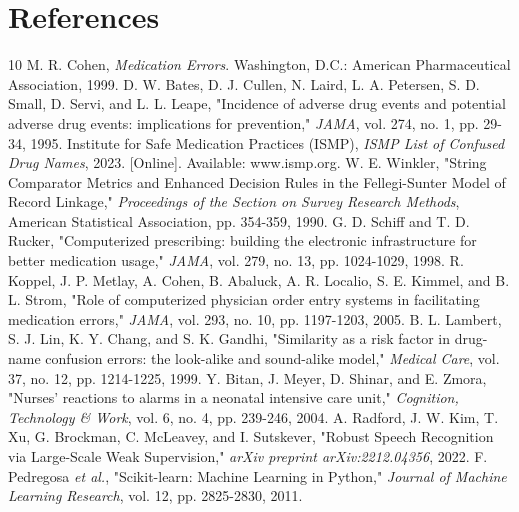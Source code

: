 \documentclass[12pt,a4paper]{report}
\begin{document}
\chapter*{References}
\begin{thebibliography}{10}
     M. R. Cohen, \textit{Medication Errors}. Washington, D.C.: American Pharmaceutical Association, 1999.
     D. W. Bates, D. J. Cullen, N. Laird, L. A. Petersen, S. D. Small, D. Servi, and L. L. Leape, "Incidence of adverse drug events and potential adverse drug events: implications for prevention," \textit{JAMA}, vol. 274, no. 1, pp. 29-34, 1995.
     Institute for Safe Medication Practices (ISMP), \textit{ISMP List of Confused Drug Names}, 2023. [Online]. Available: www.ismp.org.
     W. E. Winkler, "String Comparator Metrics and Enhanced Decision Rules in the Fellegi-Sunter Model of Record Linkage," \textit{Proceedings of the Section on Survey Research Methods}, American Statistical Association, pp. 354-359, 1990.
     G. D. Schiff and T. D. Rucker, "Computerized prescribing: building the electronic infrastructure for better medication usage," \textit{JAMA}, vol. 279, no. 13, pp. 1024-1029, 1998.
     R. Koppel, J. P. Metlay, A. Cohen, B. Abaluck, A. R. Localio, S. E. Kimmel, and B. L. Strom, "Role of computerized physician order entry systems in facilitating medication errors," \textit{JAMA}, vol. 293, no. 10, pp. 1197-1203, 2005.
     B. L. Lambert, S. J. Lin, K. Y. Chang, and S. K. Gandhi, "Similarity as a risk factor in drug-name confusion errors: the look-alike and sound-alike model," \textit{Medical Care}, vol. 37, no. 12, pp. 1214-1225, 1999.
     Y. Bitan, J. Meyer, D. Shinar, and E. Zmora, "Nurses' reactions to alarms in a neonatal intensive care unit," \textit{Cognition, Technology \& Work}, vol. 6, no. 4, pp. 239-246, 2004.
     A. Radford, J. W. Kim, T. Xu, G. Brockman, C. McLeavey, and I. Sutskever, "Robust Speech Recognition via Large-Scale Weak Supervision," \textit{arXiv preprint arXiv:2212.04356}, 2022.
     F. Pedregosa \textit{et al.}, "Scikit-learn: Machine Learning in Python," \textit{Journal of Machine Learning Research}, vol. 12, pp. 2825-2830, 2011.
\end{thebibliography}
\end{document}
